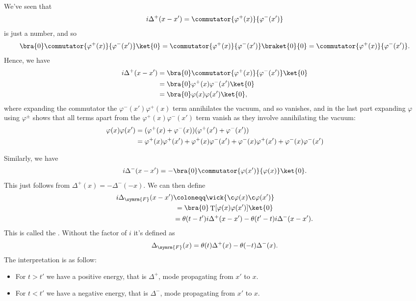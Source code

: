 \documentclass[fleqn]{NotesClass}
\newcommand{\heaviside}{\theta}
\DeclareMathOperator{\timeOrdering}{T}
\newcommand{\feynman}{\symrm{F}}
\begin{document}
    We've seen that
    \begin{equation}
        i\Delta^+(x - x') = \commutator{\varphi^+(x)}{\varphi^-(x')}
    \end{equation}
    is just a number, and so
    \begin{equation}
        \bra{0} \commutator{\varphi^+(x)}{\varphi^-(x')} \ket{0} = \commutator{\varphi^+(x)}{\varphi^-(x')} \braket{0}{0} = \commutator{\varphi^+(x)}{\varphi^-(x')}.
    \end{equation}
    Hence, we have
    \begin{align}
        i\Delta^+(x - x') &= \bra{0} \commutator{\varphi^+(x)}{\varphi^-(x')} \ket{0}\\
        &= \bra{0} \varphi^+(x)\varphi^-(x') \ket{0}\\
        &= \bra{0} \varphi(x) \varphi(x') \ket{0},
    \end{align}
    where expanding the commutator the \(\varphi^-(x')\varphi^+(x)\) term annihilates the vacuum, and so vanishes, and in the last part expanding \(\varphi\) using \(\varphi^{\pm}\) shows that all terms apart from the \(\varphi^+(x)\varphi^-(x')\) term vanish as they involve annihilating the vacuum:
    \begin{align}
        \varphi(x)\varphi(x') &= (\varphi^+(x) + \varphi^-(x))(\varphi^+(x') + \varphi^-(x'))\\
        &= \varphi^+(x)\varphi^+(x') + \varphi^+(x)\varphi^-(x') + \varphi^-(x)\varphi^+(x') + \varphi^-(x)\varphi^-(x') \notag
    \end{align}
    
    Similarly, we have
    \begin{equation}
        i\Delta^-(x - x') = -\bra{0} \commutator{\varphi(x')}{\varphi(x)}\ket{0}.
    \end{equation}
    This just follows from \(\Delta^+(x) = -\Delta^-(-x)\).
    We can then define
    \begin{align}
        i\Delta_{\feynman} (x - x') &\coloneqq \wick{\c \varphi(x) \c \varphi(x')}\\
        &\hphantom{:}= \bra{0} \timeOrdering[\varphi(x)\varphi(x')]\ket{0}\label{eqn:feynman propagator as vacuum expectation of time ordered product}\\
        &= \heaviside(t - t') i\Delta^+(x - x') - \heaviside(t' - t)i\Delta^-(x - x').
    \end{align}
    This is called the .
    Without the factor of \(i\) it's defined as
    \begin{equation}
        \Delta_{\feynman}(x) = \heaviside(t)\Delta^+(x) - \heaviside(-t)\Delta^-(x).
    \end{equation}
    The interpretation is as follow:
    \begin{itemize}
        \item For \(t > t'\) we have a positive energy, that is \(\Delta^+\), mode propagating from \(x'\) to \(x\).
        \item For \(t < t'\) we have a negative energy, that is \(\Delta^-\), mode propagating from \(x'\)  to \(x\).
    \end{itemize}
    
\end{document}
